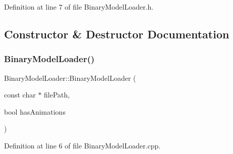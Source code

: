 Definition at line 7 of file Binary\+Model\+Loader.\+h.



\subsection{Constructor \& Destructor Documentation}
\mbox{\label{class_binary_model_loader_a0594b3d1be895c53bb661e589afa80f7}} 
\subsubsection{\texorpdfstring{Binary\+Model\+Loader()}{BinaryModelLoader()}}
{\footnotesize\ttfamily Binary\+Model\+Loader\+::\+Binary\+Model\+Loader (\begin{DoxyParamCaption}\item[{const char $\ast$}]{file\+Path,  }\item[{bool}]{has\+Animations }\end{DoxyParamCaption})}



Definition at line 6 of file Binary\+Model\+Loader.\+cpp.


